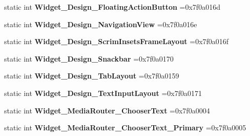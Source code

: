 \begin{DoxyCompactItemize}
static int {\bfseries Widget\+\_\+\+Design\+\_\+\+Floating\+Action\+Button} =0x7f0a016d
\item 
\mbox{\label{classandroid_1_1support_1_1v7_1_1mediarouter_1_1R_1_1style_a5691553e69b43e8d93e11eda548809b4}} 
static int {\bfseries Widget\+\_\+\+Design\+\_\+\+Navigation\+View} =0x7f0a016e
\item 
\mbox{\label{classandroid_1_1support_1_1v7_1_1mediarouter_1_1R_1_1style_a30f3062f614a70d9839a735e7b4435f0}} 
static int {\bfseries Widget\+\_\+\+Design\+\_\+\+Scrim\+Insets\+Frame\+Layout} =0x7f0a016f
\item 
\mbox{\label{classandroid_1_1support_1_1v7_1_1mediarouter_1_1R_1_1style_a0eb982f29216b9cce70803e4ad4b2abe}} 
static int {\bfseries Widget\+\_\+\+Design\+\_\+\+Snackbar} =0x7f0a0170
\item 
\mbox{\label{classandroid_1_1support_1_1v7_1_1mediarouter_1_1R_1_1style_acefa80ec5190a2906ca04f11a63ecd89}} 
static int {\bfseries Widget\+\_\+\+Design\+\_\+\+Tab\+Layout} =0x7f0a0159
\item 
\mbox{\label{classandroid_1_1support_1_1v7_1_1mediarouter_1_1R_1_1style_ae33d870c8fee11e3471417ed5948f6ec}} 
static int {\bfseries Widget\+\_\+\+Design\+\_\+\+Text\+Input\+Layout} =0x7f0a0171
\item 
\mbox{\label{classandroid_1_1support_1_1v7_1_1mediarouter_1_1R_1_1style_a64869ad33a33616ef98153c09ab69e3a}} 
static int {\bfseries Widget\+\_\+\+Media\+Router\+\_\+\+Chooser\+Text} =0x7f0a0004
\item 
\mbox{\label{classandroid_1_1support_1_1v7_1_1mediarouter_1_1R_1_1style_a229f421c8507c79b70169395b9de2a35}} 
static int {\bfseries Widget\+\_\+\+Media\+Router\+\_\+\+Chooser\+Text\+\_\+\+Primary} =0x7f0a0005
\item 
\mbox{\label{classandroid_1_1support_1_1v7_1_1mediarouter_1_1R_1_1style_a2a32cd8b9b2fdf700d2bc96140b05ee5}} 

\end{DoxyCompactItemize}
